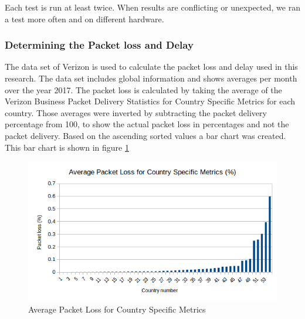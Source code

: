 \documentclass{article}
\begin{document}
Each test is run at least twice. When results are conflicting or unexpected, we
ran a test more often and on different hardware.



\subsubsection{Determining the Packet loss and Delay}

The data set of Verizon\cite{verizon-latency} is used to calculate the packet loss and delay used in this research. The data set includes global information and shows averages per month over the year 2017. The packet loss is calculated by taking the average of the Verizon Business Packet Delivery Statistics for Country Specific Metrics for each country. Those averages were inverted by subtracting the packet delivery percentage from 100, to show the actual packet loss in percentages and not the packet delivery. Based on the ascending sorted values a bar chart was created. This bar chart is shown in figure \ref{fig:packet-loss-chart}

\begin{figure}[H]
	\centering
		\includegraphics[scale=0.7]{figs/verizon-packetloss.png}
		\caption{Average Packet Loss for Country Specific Metrics}
	\label{fig:packet-loss-chart}
\end{figure}
\end{document}
